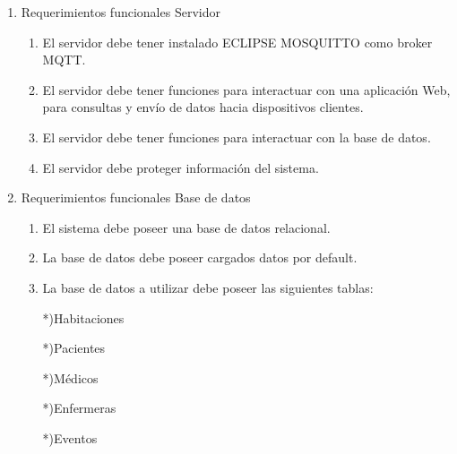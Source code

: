 \documentclass[
11pt, %
]{charter}
\begin{document}
\begin{enumerate}
	\item Requerimientos funcionales Servidor
			\begin{enumerate}
			\item El servidor debe tener instalado ECLIPSE MOSQUITTO como broker MQTT.
			\item El servidor debe tener funciones para interactuar con una aplicación Web, para consultas y envío de datos hacia dispositivos clientes.
			\item El servidor debe tener funciones para interactuar con la base de datos.
			\item El servidor debe proteger información del sistema.
			
			\end{enumerate}
	\item Requerimientos funcionales Base de datos
		\begin{enumerate}		
			\item El sistema debe poseer una base de datos relacional.
			\item La base de datos debe poseer cargados datos por default.
			\item La base de datos a utilizar debe poseer las siguientes tablas:
			
			*)Habitaciones
						
			*)Pacientes			
			
			*)Médicos
			
			*)Enfermeras			
			
			*)Eventos 


\end{enumerate}
\end{enumerate}
\end{document}
